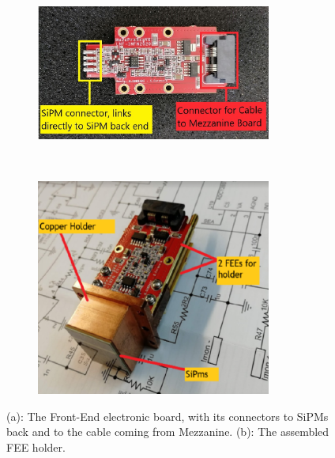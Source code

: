 \begin{figure}[!h]
    \centering
    \begin{subfigure}[t]{0.5\textwidth}
        \centering
        \includegraphics[width=0.85\textwidth]{figures/png/Screenshot_20240706_143204.png}
        \caption{}
        \label{fig:connectiontomezzanine}
    \end{subfigure}%
    ~ 
    \begin{subfigure}[t]{0.5\textwidth}
        \centering
        \includegraphics[width=0.85\textwidth]{figures/png/Screenshot_20240706_143517.png}
        \caption{}
        \label{fig:holder}
    \end{subfigure}
   \caption[The calorimeter Front-End electronic board.]{(a): The Front-End electronic board, with its connectors to SiPMs 
   back and to the cable coming from Mezzanine. 
   (b): The assembled FEE holder.}
    \label{fig:calooo}
  \end{figure}


